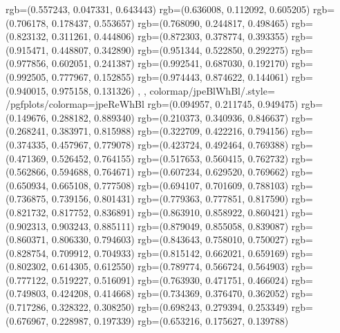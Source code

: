 {{{                    rgb=(0.557243, 0.047331, 0.643443)
                    rgb=(0.636008, 0.112092, 0.605205)
                    rgb=(0.706178, 0.178437, 0.553657)
                    rgb=(0.768090, 0.244817, 0.498465)
                    rgb=(0.823132, 0.311261, 0.444806)
                    rgb=(0.872303, 0.378774, 0.393355)
                    rgb=(0.915471, 0.448807, 0.342890)
                    rgb=(0.951344, 0.522850, 0.292275)
                    rgb=(0.977856, 0.602051, 0.241387)
                    rgb=(0.992541, 0.687030, 0.192170)
                    rgb=(0.992505, 0.777967, 0.152855)
                    rgb=(0.974443, 0.874622, 0.144061)
                    rgb=(0.940015, 0.975158, 0.131326)
                },
        },
    colormap/jpeBlWhBl/.style={%
            /pgfplots/colormap={jpeReWhBl}{%
                    rgb=(0.094957, 0.211745, 0.949475)
                    rgb=(0.149676, 0.288182, 0.889340)
                    rgb=(0.210373, 0.340936, 0.846637)
                    rgb=(0.268241, 0.383971, 0.815988)
                    rgb=(0.322709, 0.422216, 0.794156)
                    rgb=(0.374335, 0.457967, 0.779078)
                    rgb=(0.423724, 0.492464, 0.769388)
                    rgb=(0.471369, 0.526452, 0.764155)
                    rgb=(0.517653, 0.560415, 0.762732)
                    rgb=(0.562866, 0.594688, 0.764671)
                    rgb=(0.607234, 0.629520, 0.769662)
                    rgb=(0.650934, 0.665108, 0.777508)
                    rgb=(0.694107, 0.701609, 0.788103)
                    rgb=(0.736875, 0.739156, 0.801431)
                    rgb=(0.779363, 0.777851, 0.817590)
                    rgb=(0.821732, 0.817752, 0.836891)
                    rgb=(0.863910, 0.858922, 0.860421)
                    rgb=(0.902313, 0.903243, 0.885111)
                    rgb=(0.879049, 0.855058, 0.839087)
                    rgb=(0.860371, 0.806330, 0.794603)
                    rgb=(0.843643, 0.758010, 0.750027)
                    rgb=(0.828754, 0.709912, 0.704933)
                    rgb=(0.815142, 0.662021, 0.659169)
                    rgb=(0.802302, 0.614305, 0.612550)
                    rgb=(0.789774, 0.566724, 0.564903)
                    rgb=(0.777122, 0.519227, 0.516091)
                    rgb=(0.763930, 0.471751, 0.466024)
                    rgb=(0.749803, 0.424208, 0.414668)
                    rgb=(0.734369, 0.376470, 0.362052)
                    rgb=(0.717286, 0.328322, 0.308250)
                    rgb=(0.698243, 0.279394, 0.253349)
                    rgb=(0.676967, 0.228987, 0.197339)
                    rgb=(0.653216, 0.175627, 0.139788)
}}}
